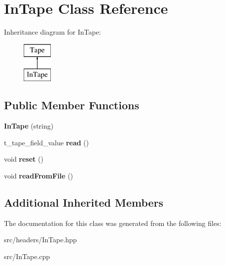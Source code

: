 \hypertarget{classInTape}{\section{In\-Tape Class Reference}
\label{classInTape}
}
Inheritance diagram for In\-Tape\-:\begin{figure}[H]
\begin{center}
\leavevmode
\includegraphics[height=2.000000cm]{classInTape}
\end{center}
\end{figure}
\subsection*{Public Member Functions}
\begin{DoxyCompactItemize}
\item 
\hypertarget{classInTape_a814ac605f20d11e3ce900c17b9676fb9}{{\bfseries In\-Tape} (string)}\label{classInTape_a814ac605f20d11e3ce900c17b9676fb9}

\item 
\hypertarget{classInTape_a3aab7f78892c5f6d18652dbf6d49a571}{t\-\_\-tape\-\_\-field\-\_\-value {\bfseries read} ()}\label{classInTape_a3aab7f78892c5f6d18652dbf6d49a571}

\item 
\hypertarget{classInTape_a37c277211ba120801b8cfeb9d3216dc4}{void {\bfseries reset} ()}\label{classInTape_a37c277211ba120801b8cfeb9d3216dc4}

\item 
\hypertarget{classInTape_a1521797ba73ba4ad89021e34db0f44e1}{void {\bfseries read\-From\-File} ()}\label{classInTape_a1521797ba73ba4ad89021e34db0f44e1}

\end{DoxyCompactItemize}
\subsection*{Additional Inherited Members}


The documentation for this class was generated from the following files\-:\begin{DoxyCompactItemize}
\item 
src/headers/In\-Tape.\-hpp\item 
src/In\-Tape.\-cpp\end{DoxyCompactItemize}
